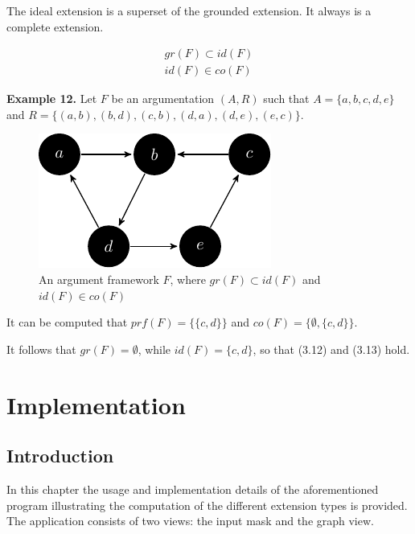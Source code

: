 \documentclass[draft,final]{vutinfth} %
\newcommand{\hl}{\par\vspace{6pt}} %
\newcommand{\cl}{\par\vspace{12pt}} %
\begin{document}
The ideal extension is a superset of the grounded extension. It always is a complete extension.

\begin{align}
	gr(F)\subset id(F)\\ %
	id(F)\in co(F) %
\end{align}\cl

\textbf{Example 12.} Let $F$ be an argumentation $(A,R)$ such that $A=\{a,b,c,d,e\}$ and $R=\{(a,b),(b,d),(c,b),(d,a),(d,e),(e,c)\}$.\hl

\FloatBarrier
	\begin{figure}[!h]
		\centering
		\includegraphics[scale=1.5]{graphs/ex6.pdf}
		\caption{An argument framework $F$, where $gr(F)\subset id(F)$ and $id(F)\in co(F)$}
	\end{figure}
\FloatBarrier

It can be computed that $prf(F)=\{\{c,d\}\}$ and $co(F)=\{\emptyset,\{c,d\}\}$.\hl
It follows that $gr(F)=\emptyset$, while $id(F)=\{c,d\}$, so that (3.12) and (3.13) hold.\cl


\chapter{Implementation}

\section{Introduction}
In this chapter the usage and implementation details of the aforementioned program illustrating the computation of the different extension types is provided. The application consists of two views: the input mask and the graph view.
\end{document}
